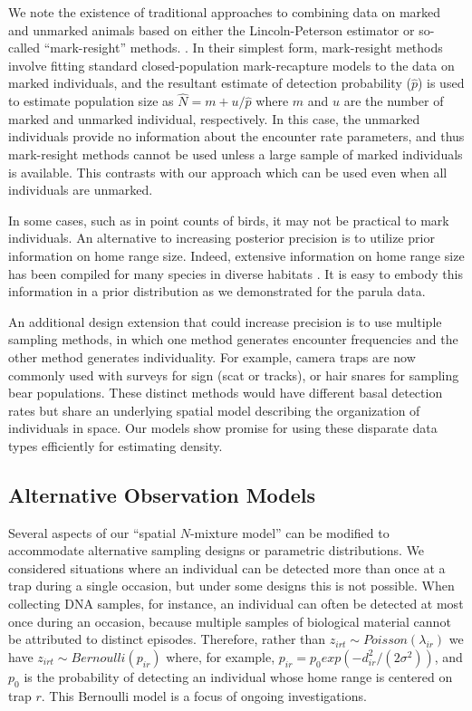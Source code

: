 We note the existence of traditional approaches to combining data on
marked and unmarked animals based on either the Lincoln-Peterson
estimator or so-called ``mark-resight'' methods.
\citep{bartmann_etal:1987, mintaMangel:89, mcclintockHoeting:09}. In their
simplest form, mark-resight methods involve fitting standard
closed-population mark-recapture models to the data on marked
individuals, and the resultant estimate of detection probability
($\hat{p}$) is used to estimate population size as $\hat{N} = m +
u/\hat{p}$ where $m$ and $u$ are the number of
marked and unmarked individual, respectively. In this case,
the unmarked individuals provide no information about the
encounter rate parameters, and thus mark-resight methods cannot be
used unless a large sample of marked individuals is available. This
contrasts with our approach which can be used even when all
individuals are unmarked.

In some cases, such as in point counts of birds, it may not be
practical to mark individuals. An alternative to increasing posterior
precision is to utilize prior information on
home range size. Indeed, extensive information on home range size has
been compiled for many species in diverse habitats %
\citep[\emph{e.g.},][]{degraaf_yamasaki:2001}. It is
easy to embody this information in a prior distribution as we
demonstrated for the parula data.

An additional design extension that could increase precision is to use
multiple sampling methods, in which one method generates encounter
frequencies and the other method generates individuality.
For example, camera traps are now commonly used with surveys for
sign (scat or tracks), or hair snares for sampling bear populations.
These distinct methods would have different basal detection
rates but share an underlying spatial model describing the
organization of individuals in space.
Our models show promise for using
these disparate data types efficiently
for estimating density.




\subsection{Alternative Observation Models}
\label{ss:ext}

Several aspects of our ``spatial $N$-mixture model'' can be modified
to accommodate
alternative sampling designs or parametric distributions.
We considered situations where an individual can be detected more than
once at a trap during a single occasion, but under some designs this
is not possible. When collecting DNA samples, for instance, an
individual can often be detected at most once during an
occasion, because multiple samples of biological material cannot be
attributed
to distinct episodes. Therefore, rather than $z_{irt} \sim Poisson(\lambda_{ir})$
we have $z_{irt} \sim Bernoulli(p_{ir})$ where, for example,  $p_{ir} = p_0
exp(-d_{ir}^2/(2\sigma^2))$, and $p_0$ is the probability of
detecting an individual whose home range is centered on trap $r$. This
Bernoulli model is a focus of ongoing investigations.

